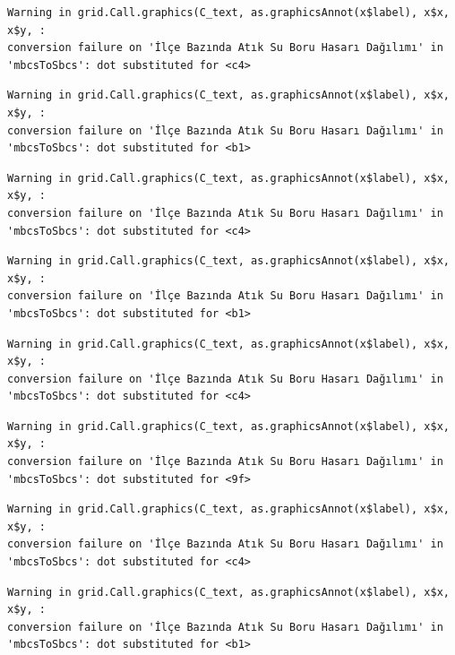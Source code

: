 \documentclass[
  11pt,
  a4paper,
  DIV=11,
  numbers=noendperiod]{scrartcl}
\begin{document}
\begin{verbatim}
Warning in grid.Call.graphics(C_text, as.graphicsAnnot(x$label), x$x, x$y, :
conversion failure on 'İlçe Bazında Atık Su Boru Hasarı Dağılımı' in
'mbcsToSbcs': dot substituted for <c4>
\end{verbatim}

\begin{verbatim}
Warning in grid.Call.graphics(C_text, as.graphicsAnnot(x$label), x$x, x$y, :
conversion failure on 'İlçe Bazında Atık Su Boru Hasarı Dağılımı' in
'mbcsToSbcs': dot substituted for <b1>
\end{verbatim}

\begin{verbatim}
Warning in grid.Call.graphics(C_text, as.graphicsAnnot(x$label), x$x, x$y, :
conversion failure on 'İlçe Bazında Atık Su Boru Hasarı Dağılımı' in
'mbcsToSbcs': dot substituted for <c4>
\end{verbatim}

\begin{verbatim}
Warning in grid.Call.graphics(C_text, as.graphicsAnnot(x$label), x$x, x$y, :
conversion failure on 'İlçe Bazında Atık Su Boru Hasarı Dağılımı' in
'mbcsToSbcs': dot substituted for <b1>
\end{verbatim}

\begin{verbatim}
Warning in grid.Call.graphics(C_text, as.graphicsAnnot(x$label), x$x, x$y, :
conversion failure on 'İlçe Bazında Atık Su Boru Hasarı Dağılımı' in
'mbcsToSbcs': dot substituted for <c4>
\end{verbatim}

\begin{verbatim}
Warning in grid.Call.graphics(C_text, as.graphicsAnnot(x$label), x$x, x$y, :
conversion failure on 'İlçe Bazında Atık Su Boru Hasarı Dağılımı' in
'mbcsToSbcs': dot substituted for <9f>
\end{verbatim}

\begin{verbatim}
Warning in grid.Call.graphics(C_text, as.graphicsAnnot(x$label), x$x, x$y, :
conversion failure on 'İlçe Bazında Atık Su Boru Hasarı Dağılımı' in
'mbcsToSbcs': dot substituted for <c4>
\end{verbatim}

\begin{verbatim}
Warning in grid.Call.graphics(C_text, as.graphicsAnnot(x$label), x$x, x$y, :
conversion failure on 'İlçe Bazında Atık Su Boru Hasarı Dağılımı' in
'mbcsToSbcs': dot substituted for <b1>
\end{verbatim}
\end{document}
